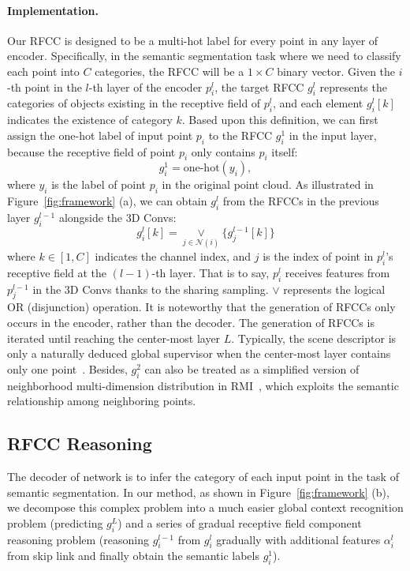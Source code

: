 \documentclass[final]{cvpr}
\begin{document}
\paragraph{Implementation.} Our RFCC is designed to be a multi-hot label for every point in any layer of encoder. Specifically, in the semantic segmentation task where we need to classify each point into $C$ categories, the RFCC will be a $1\times C$ binary vector. Given the $i$-th point in the $l$-th layer of the encoder $p_i^l$, the target RFCC $g_i^l$ represents the categories of objects existing in the receptive field of $p_i^l$, and each element $g_i^l[k]$ indicates the existence of category $k$.
Based upon this definition, we can first assign the one-hot label of input point $p_i$ to the RFCC $g_i^1$ in the input layer, because the receptive field of point $p_i$ only contains $p_i$ itself:
\begin{equation}
    g_i^1 = \text{one-hot}(y_i),
\end{equation}
where $y_i$ is the label of point $p_i$ in the original point cloud.
As illustrated in Figure~\ref{fig:framework} (a), we can obtain $g_i^l$ from the RFCCs in the previous layer $g_i^{l-1}$ alongside the 3D Convs:
\begin{equation}
    g_i^l[k] = \mathop{\lor}\limits_{j\in\mathcal{N}(i)} \{g_j^{l-1}[k]\}
\end{equation}
where $k\in [1,C]$ indicates the channel index, and $j$ is the index of point in $p_i^l$'s receptive field at the $(l-1)$-th layer. That is to say, $p_i^l$ receives features from $p_j^{l-1}$ in the 3D Convs thanks to the sharing sampling. $\lor$ represents the logical OR (disjunction) operation. It is noteworthy that the generation of RFCCs only occurs in the encoder, rather than the decoder. The generation of RFCCs is iterated until reaching the center-most layer $L$.
Typically, the scene descriptor is only a naturally deduced global supervisor when the center-most layer contains only one point~\cite{xu2020sceneencoder}. Besides, $g_i^2$ can also be treated as a simplified version of neighborhood multi-dimension distribution in RMI~\cite{zhao2019region}, which exploits the semantic relationship among neighboring points.

\subsection{RFCC Reasoning}
\label{subsec:reasoning}
The decoder of network is to infer the category of each input point in the task of semantic segmentation. In our method, as shown in Figure~\ref{fig:framework} (b), we decompose this complex problem into a much easier global context recognition problem (predicting $g_i^L$) and a series of gradual receptive field component reasoning problem (reasoning $g_i^{l-1}$ from $g_i^l$ gradually with additional features $\alpha_i^l$ from skip link and finally obtain the semantic labels $g_i^1$).
\end{document}
